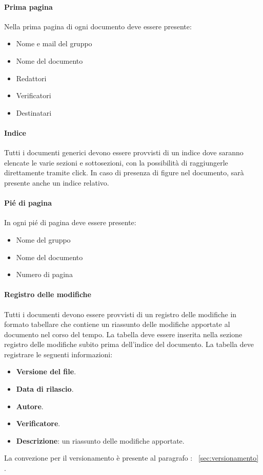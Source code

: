 \paragraph*{Prima pagina}
Nella prima pagina di ogni documento deve essere presente:
\begin{itemize}
    \item Nome e mail del gruppo
    \item Nome del documento
    \item Redattori
    \item Verificatori
    \item Destinatari
\end{itemize}
\paragraph*{Indice}
Tutti i documenti generici devono essere provvisti di un indice dove saranno elencate le varie sezioni e sottosezioni, con la possibilità di raggiungerle direttamente tramite click.
In caso di presenza di figure nel documento, sarà presente anche un indice relativo.
\paragraph*{Pié di pagina}
In ogni pié di pagina deve essere presente:
\begin{itemize}
    \item Nome del gruppo
    \item Nome del documento
    \item Numero di pagina
\end{itemize}
\paragraph*{Registro delle modifiche}\label{sec:RegistroModifiche}
Tutti i documenti devono essere provvisti di un registro delle modifiche in formato tabellare che contiene un riassunto
delle modifiche apportate al documento nel corso del tempo.
La tabella  deve essere inserita nella
sezione registro delle modifiche subito prima dell’indice del documento.
La tabella deve registrare le seguenti informazioni:
\begin{itemize}
    \item \textbf{Versione del file}.
    \item \textbf{Data di rilascio}.
    \item \textbf{Autore}.
    \item \textbf{Verificatore}.
    \item \textbf{Descrizione}: un riassunto delle modifiche apportate.
\end{itemize}
La convezione per il versionamento è presente al paragrafo : ~\ref{sec:versionamento} .
